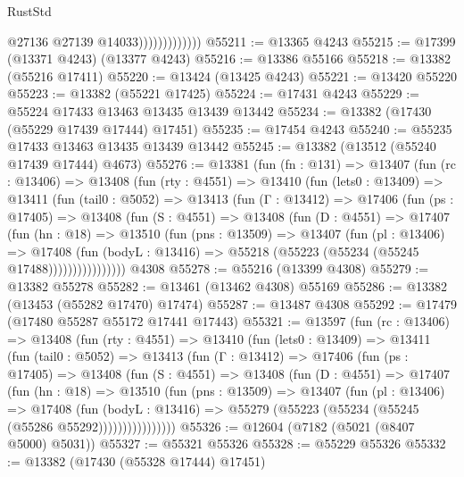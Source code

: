 \begin{lexlean}{RustStd}
\begin{coremodule}
                              @27136
                              @27139
                              @14033)))))))))))))
@55211 := @13365 @4243
@55215 := @17399 (@13371 @4243) (@13377 @4243)
@55216 := @13386 @55166
@55218 := @13382 (@55216 @17411)
@55220 := @13424 (@13425 @4243)
@55221 := @13420 @55220
@55223 := @13382 (@55221 @17425)
@55224 := @17431 @4243
@55229 := @55224 @17433 @13463 @13435 @13439 @13442
@55234 := @13382 (@17430 (@55229 @17439 @17444) @17451)
@55235 := @17454 @4243
@55240 := @55235 @17433 @13463 @13435 @13439 @13442
@55245 := @13382 (@13512 (@55240 @17439 @17444) @4673)
@55276 := @13381
    (fun (fn : @131) =>
    @13407
      (fun (rc : @13406) =>
      @13408
        (fun (rty : @4551) =>
        @13410
          (fun (lets0 : @13409) =>
          @13411
            (fun (tail0 : @5052) =>
            @13413
              (fun (Γ : @13412) =>
              @17406
                (fun (ps : @17405) =>
                @13408
                  (fun (S : @4551) =>
                  @13408
                    (fun (D : @4551) =>
                    @17407
                      (fun (hn : @18) =>
                      @13510
                        (fun (pns : @13509) =>
                        @13407
                          (fun (pl : @13406) =>
                          @17408
                            (fun (bodyL : @13416) =>
                            @55218 (@55223 (@55234 (@55245 @17488))))))))))))))))
    @4308
@55278 := @55216 (@13399 @4308)
@55279 := @13382 @55278
@55282 := @13461 (@13462 @4308) @55169
@55286 := @13382 (@13453 (@55282 @17470) @17474)
@55287 := @13487 @4308
@55292 := @17479 (@17480 @55287 @55172 @17441 @17443)
@55321 := @13597
    (fun (rc : @13406) =>
    @13408
      (fun (rty : @4551) =>
      @13410
        (fun (lets0 : @13409) =>
        @13411
          (fun (tail0 : @5052) =>
          @13413
            (fun (Γ : @13412) =>
            @17406
              (fun (ps : @17405) =>
              @13408
                (fun (S : @4551) =>
                @13408
                  (fun (D : @4551) =>
                  @17407
                    (fun (hn : @18) =>
                    @13510
                      (fun (pns : @13509) =>
                      @13407
                        (fun (pl : @13406) =>
                        @17408
                          (fun (bodyL : @13416) =>
                          @55279 (@55223 (@55234 (@55245 (@55286 @55292))))))))))))))))
@55326 := @12604 (@7182 (@5021 (@8407 @5000) @5031))
@55327 := @55321 @55326
@55328 := @55229 @55326
@55332 := @13382 (@17430 (@55328 @17444) @17451)

\end{coremodule}
\end{lexlean}
